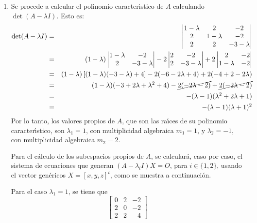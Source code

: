 \begin{solucion}
\begin{enumerate}[$a$)]
  \item Se procede a calcular el polinomio caracter\'{\i}stico de $A$ calculando $\det(A - \lambda I)$. Esto es:
  \begin{eqnarray*}
   \det(A - \lambda I) & = &
   \begin{vmatrix}
    1-\lambda & 2 & -2 \\
    2 & 1-\lambda & -2 \\
    2 & 2 & -3-\lambda
   \end{vmatrix} \\
   & = & 
   (1-\lambda)
   \begin{vmatrix}
    1-\lambda & -2 \\
    2 & -3-\lambda 
   \end{vmatrix}
   -2
   \begin{vmatrix}
    2 & -2 \\
    2 & -3-\lambda
   \end{vmatrix}
   +2
   \begin{vmatrix}
    2 & -2 \\
    1-\lambda & -2
   \end{vmatrix} \\
   & = & (1-\lambda)\left[ (1-\lambda)(-3-\lambda) + 4 \right] -2(-6-2\lambda + 4) +2(-4 + 2 -2\lambda) \\
   & = & (1-\lambda)(-3 + 2\lambda + \lambda^2 + 4) - \cancel{2(-2\lambda - 2)} + \cancel{2(-2\lambda - 2)} \\ 
   & = & -(\lambda-1)(\lambda^2 + 2\lambda + 1) \\ 
   & = & -(\lambda-1)(\lambda+1)^2
  \end{eqnarray*}
  Por lo tanto, los valores propios de $A$, que son las ra\'{\i}ces de su polinomio caracter\'{\i}stico, son $\lambda_1 = 1$, con multiplicidad algebraica $m_1 = 1$, y $\lambda_2 = -1$, con multiplicidad algebraica $m_2 = 2$.
  \par 
  Para el c\'alculo de los subespacios propios de $A$, se calcular\'a, caso por caso, el sistema de ecuaciones que generan $(A-\lambda_i I)X = O$, para $i \in \{ 1,2 \}$, usando el vector gen\'ericos $X = [x,y,z]^t$, como se muestra a continuaci\'on.
  \par 
  Para el caso $\lambda_1 = 1$, se tiene que 
  \begin{equation*}
   \begin{bmatrix}
    0 & 2 & -2 \\
    2 & 0 & -2 \\
    2 & 2 & -4
   \end{bmatrix}

\end{equation*}
\end{enumerate}
\end{solucion}
